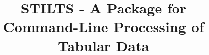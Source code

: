 \documentclass[11pt,twoside]{article}  %
\begin{document}

%
%
%


%
% 
%
%

\title{STILTS - A Package for Command-Line Processing of Tabular Data}

%
%
%
\end{document}

